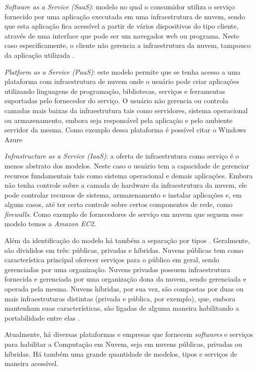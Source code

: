 \textit{Software as a Service (SaaS)}: modelo no qual o consumidor utiliza o serviço fornecido por uma aplicação executada em uma infraestrutura de nuvem, sendo que esta aplicação fica acessível a partir de vários dispositivos do tipo cliente, através de uma interface que pode ser um navegador web ou programa. Neste caso especificamente, o cliente não gerencia a infraestrutura da nuvem, tampouco da aplicação utilizada \cite{mell2011nist}. 

\textit{Platform as a Service (PaaS)}: este modelo permite que se tenha acesso a uma plataforma com infraestrutura de nuvem onde o usuário pode criar aplicações utilizando linguagens de programação, bibliotecas, serviços e ferramentas suportadas pelo fornecedor do serviço. O usuário não gerencia ou controla camadas mais baixas da infraestrutura tais como servidores, sistema operacional ou armazenamento, embora seja responsável pela aplicação e pelo ambiente servidor da mesma\cite{mell2011nist}. Como exemplo dessa plataforma é possível citar o Windows Azure \cite{Azure}

\textit{Infrastructure as a Service (IaaS)}: a oferta de infraestrutura como serviço é o menos abstrato dos modelos. Neste caso o usuário tem a capacidade de gerenciar recursos fundamentais tais como sistema operacional e demais aplicações. Embora não tenha controle sobre a camada de hardware da infraestrutura da nuvem, ele pode controlar recursos de sistema, armazenamento e instalar aplicações e, em alguns casos, até ter certo controle sobre certos componentes de rede, como \textit{firewalls}\cite{zhang2010cloud}. Como exemplo de fornecedores de serviço em nuvem que seguem esse modelo temos a \textit{Amazon EC2}\cite{AmazonEC2}. 

Além da identificação do modelo há também a separação por tipos \cite{zhang2010cloud}. Geralmente, são divididos em três: públicas, privadas e híbridas. Nuvens públicas tem como característica principal oferecer serviços para o público em geral, sendo gerenciadas por uma organização. Nuvens privadas possuem infraestrutura fornecida e gerenciada por uma organização dona da nuvem, sendo gerenciada e operada pela mesma. Nuvens híbridas, por sua vez, são compostas por duas ou mais infraestruturas distintas (privada e pública, por exemplo), que, embora mantenham suas características, são ligadas de alguma maneira habilitando a portabilidade entre elas\cite{mell2011nist} \cite{zhang2010cloud} \cite{Bhaskar}.

Atualmente, há diversas plataformas e empresas que fornecem \textit{softwares} e serviços para habilitar a Computação em Nuvem, seja em nuvens públicas, privadas ou híbridas. Há também uma grande quantidade de modelos, tipos e serviços de maneira acessível. 
\newline

